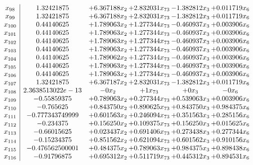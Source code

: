 \documentclass[11pt]{article}
\begin{document}
\[\begin{array}{c| c c@{\hskip 2pt} c@{\hskip 2pt} c@{\hskip 2pt} c@{\hskip 2pt} }
 x_{98}   &  1.32421875 & + 6.367188 x_{2} & + 2.832031 x_{73} & -1.382812 x_{3} & + 0.011719 x_{6}\\
 x_{99}   &  1.32421875 & + 6.367188 x_{2} & + 2.832031 x_{73} & -1.382812 x_{3} & + 0.011719 x_{6}\\
 x_{100}   &  0.44140625 & + 1.789063 x_{2} & + 1.277344 x_{73} & -0.460937 x_{3} & + 0.003906 x_{6}\\
 x_{101}   &  0.44140625 & + 1.789063 x_{2} & + 1.277344 x_{73} & -0.460937 x_{3} & + 0.003906 x_{6}\\
 x_{102}   &  0.44140625 & + 1.789063 x_{2} & + 1.277344 x_{73} & -0.460937 x_{3} & + 0.003906 x_{6}\\
 x_{103}   &  0.44140625 & + 1.789063 x_{2} & + 1.277344 x_{73} & -0.460937 x_{3} & + 0.003906 x_{6}\\
 x_{104}   &  0.44140625 & + 1.789062 x_{2} & + 1.277344 x_{73} & -0.460937 x_{3} & + 0.003906 x_{6}\\
 x_{105}   &  0.44140625 & + 1.789063 x_{2} & + 1.277344 x_{73} & -0.460937 x_{3} & + 0.003906 x_{6}\\
 x_{106}   &  0.44140625 & + 1.789063 x_{2} & + 1.277344 x_{73} & -0.460937 x_{3} & + 0.003906 x_{6}\\
 x_{107}   &  1.32421875 & + 6.367187 x_{2} & + 2.832031 x_{73} & -1.382812 x_{3} & + 0.011719 x_{6}\\
 x_{108}   &  2.3638513022e-13 & -0 x_{2} & + 1 x_{73} & + 0 x_{3} & -0 x_{6}\\
 x_{109}   &  -0.55859375 & + 0.789063 x_{2} & + 0.277344 x_{73} & + 0.539063 x_{3} & + 0.003906 x_{6}\\
 x_{110}   &  -0.765625 & + 0.843750 x_{2} & + 0.890625 x_{73} & + 0.843750 x_{3} & + 0.984375 x_{6}\\
 x_{111}   &  -0.777343749999 & + 0.601563 x_{2} & + 0.246094 x_{73} & + 0.351563 x_{3} & + 0.285156 x_{6}\\
 x_{112}   &  -0.234375 & + 0.156250 x_{2} & + 0.109375 x_{73} & + 0.156250 x_{3} & + 0.015625 x_{6}\\
 x_{113}   &  -0.66015625 & + 0.023437 x_{2} & + 0.691406 x_{73} & + 0.273438 x_{3} & + 0.277344 x_{6}\\
 x_{114}   &  -0.15234375 & + 0.851562 x_{2} & + 0.621094 x_{73} & + 0.601562 x_{3} & + 0.910156 x_{6}\\
 x_{115}   &  -0.476562500001 & + 0.484375 x_{2} & + 0.789063 x_{73} & + 0.984375 x_{3} & + 0.898438 x_{6}\\
 x_{116}   &  -0.91796875 & + 0.695312 x_{2} & + 0.511719 x_{73} & + 0.445312 x_{3} & + 0.894531 x_{6}\\

\end{array}\]
\end{document}
